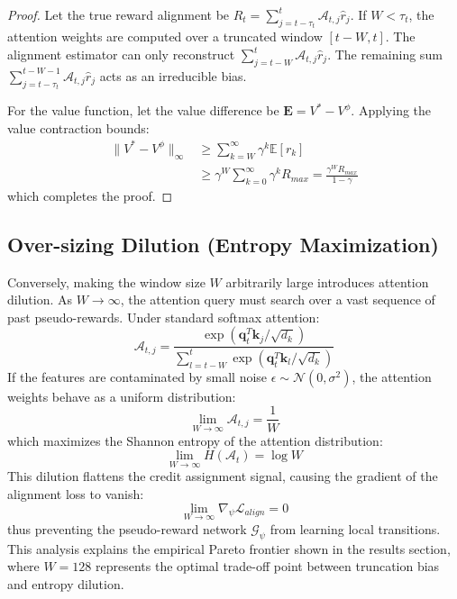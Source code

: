 \documentclass[manuscript, screen, review]{jair}
\begin{document}
\begin{proof}
Let the true reward alignment be $R_t = \sum_{j=t-\tau_t}^{t} \mathcal{A}_{t, j} \hat{r}_j$. If $W < \tau_t$, the attention weights are computed over a truncated window $[t-W, t]$. The alignment estimator can only reconstruct $\sum_{j=t-W}^t \mathcal{A}_{t, j} \hat{r}_j$. The remaining sum $\sum_{j=t-\tau_t}^{t-W-1} \mathcal{A}_{t, j} \hat{r}_j$ acts as an irreducible bias.

For the value function, let the value difference be $\mathbf{E} = V^* - V^\phi$. Applying the value contraction bounds:
\begin{align*}
    \| V^* - V^\phi \|_\infty &\ge \sum_{k=W}^{\infty} \gamma^k \mathbb{E} [r_k] \\
    &\ge \gamma^W \sum_{k=0}^{\infty} \gamma^k R_{max} = \frac{\gamma^W R_{max}}{1-\gamma}
\end{align*}
which completes the proof.
\end{proof}

\subsection{Over-sizing Dilution (Entropy Maximization)}\label{app:sub_oversizing}
Conversely, making the window size $W$ arbitrarily large introduces attention dilution. As $W \to \infty$, the attention query must search over a vast sequence of past pseudo-rewards. Under standard softmax attention:
\begin{equation}
    \mathcal{A}_{t, j} = \frac{\exp\left( \mathbf{q}_t^T \mathbf{k}_j / \sqrt{d_k} \right)}{\sum_{l=t-W}^{t} \exp\left( \mathbf{q}_t^T \mathbf{k}_l / \sqrt{d_k} \right)}
\end{equation}
If the features are contaminated by small noise $\epsilon \sim \mathcal{N}(0, \sigma^2)$, the attention weights behave as a uniform distribution:
\begin{equation}
    \lim_{W \to \infty} \mathcal{A}_{t, j} = \frac{1}{W}
\end{equation}
which maximizes the Shannon entropy of the attention distribution:
\begin{equation}
    \lim_{W \to \infty} H(\mathcal{A}_t) = \log W
\end{equation}
This dilution flattens the credit assignment signal, causing the gradient of the alignment loss to vanish:
\begin{equation}
    \lim_{W \to \infty} \nabla_\psi \mathcal{L}_{align} = 0
\end{equation}
thus preventing the pseudo-reward network $\mathcal{G}_\psi$ from learning local transitions. This analysis explains the empirical Pareto frontier shown in the results section, where $W=128$ represents the optimal trade-off point between truncation bias and entropy dilution.
\end{document}
